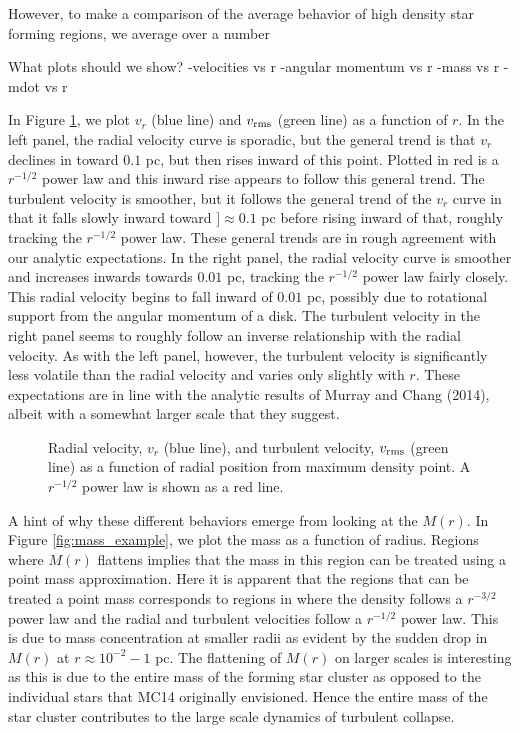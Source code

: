 \documentclass{emulateapj}
\begin{document}
However, to make a comparison of the average behavior of high density star forming regions, we average over a number 

What plots should we show?
-velocities vs r
-angular momentum vs r
-mass vs r
-mdot vs r

In Figure \ref{fig:vr_example}, we plot $v_r$ (blue line) and $v_{\rm rms}$ (green line) as a function of $r$.  In the left panel, the radial velocity curve is sporadic, but the general trend is that $v_r$ declines in toward $0.1$ pc, but then rises inward of this point.  Plotted in red is a $r^{-1/2}$ power law and this inward rise appears to follow this general trend.  The turbulent velocity is smoother, but it follows the general trend of the $v_r$ curve in that it falls slowly inward toward $]\approx 0.1 $ pc before rising inward of that, roughly tracking the $r^{-1/2}$ power law.  These general trends are in rough agreement with our analytic expectations.  In the right panel, the radial velocity curve is smoother and increases inwards towards $0.01$ pc, tracking the $r^{-1/2}$ power law fairly closely.  This radial velocity begins to fall inward of $0.01$ pc, possibly due to rotational support from the angular momentum of a disk.  The turbulent velocity in the right panel seems to roughly follow an inverse relationship with the radial velocity.  As with the left panel, however, the turbulent velocity is significantly less volatile than the radial velocity and varies only slightly with $r$.   These expectations are in line with the analytic results of Murray and Chang (2014), albeit with a somewhat larger scale that they suggest.  
 
\begin{figure}
\caption{Radial velocity, $v_r$ (blue line), and turbulent velocity, $v_{\rm rms}$ (green line) as a function of radial position from maximum density point.  A $r^{-1/2}$ power law is shown as a red line. \label{fig:vr_example}}
\end{figure}

A hint of why these different behaviors emerge from looking at the $M(r)$.  In Figure \ref{fig:mass_example}, we plot the mass as a function of radius.  Regions where $M(r)$ flattens implies that the mass in this region can be treated using a point mass approximation.  Here it is apparent that the regions that can be treated a point mass corresponds to regions in where the density follows a $r^{-3/2}$ power law and the radial and turbulent velocities follow a $r^{-1/2}$ power law.  This is due to mass concentration at smaller radii as evident by the sudden drop in $M(r)$ at $r \approx 10^{-2} - 1$ pc.  The flattening of $M(r)$ on larger scales is interesting as this is due to the entire mass of the forming star cluster as opposed to the individual stars that MC14 originally envisioned.  Hence the entire mass of the star cluster contributes to the large scale dynamics of turbulent collapse.    
\end{document}
